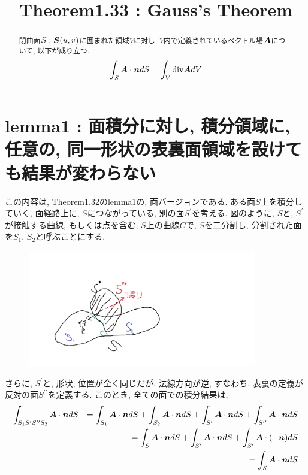 \documentclass{jsarticle}
\title{Theorem1.33 : Gauss's Theorem}
\newcommand*{\mbold}[1]{\mbox{\boldmath $#1$}}
\newcommand*{\divg}{{\rm div}}
\begin{document}
\maketitle

\begin{abstract}
  閉曲面$S : \mbold{S}(u, v)$に囲まれた領域$V$に対し, $V$内で定義されているベクトル場$\mbold{A}$について, 以下が成り立つ. 
  \begin{eqnarray}
    \int_S \mbold{A}\cdot \mbold{n}dS = \int_V \divg \mbold{A}dV 
  \end{eqnarray}
\end{abstract}

\section{lemma1 : 面積分に対し, 積分領域に, 任意の, 同一形状の表裏面領域を設けても結果が変わらない}
この内容は, Theorem1.32のlemma1の, 面バージョンである. 
ある面$S$上を積分していく, 面経路上に, $S$につながっている, 別の面$S^\prime$を考える. 
図のように, $S$と, $S^\prime$が接触する曲線, もしくは点を含む, $S$上の曲線$C$で, $S$を二分割し, 分割された面を$S_1$, $S_2$と呼ぶことにする. 
\begin{figure}[htbp]
  \begin{center}
    \includegraphics[width=10cm]{Figure/SurfaceAdd.png}
  \end{center}
\end{figure}

さらに, $S^\prime$と, 形状, 位置が全く同じだが, 法線方向が逆, すなわち, 表裏の定義が反対の面$S^{\prime\prime}$を定義する. 
このとき, 全ての面での積分結果は, 
\begin{eqnarray}
  \int_{S_1 S^\prime S^{\prime\prime} S_2}\mbold{A}\cdot\mbold{n}dS 
  && = \int_{S_1}\mbold{A}\cdot\mbold{n}dS + \int_{S_2}\mbold{A}\cdot\mbold{n}dS 
  + \int_{S^\prime}\mbold{A}\cdot\mbold{n}dS + \int_{S^{\prime\prime}}\mbold{A}\cdot\mbold{n}dS \nonumber \\
  && = \int_{S}\mbold{A}\cdot\mbold{n}dS
+ \int_{S^\prime}\mbold{A}\cdot\mbold{n}dS + \int_{S^\prime}\mbold{A}\cdot (-\mbold{n})dS \nonumber \\
  && = \int_{S}\mbold{A}\cdot\mbold{n}dS
\end{eqnarray}
\end{document}
